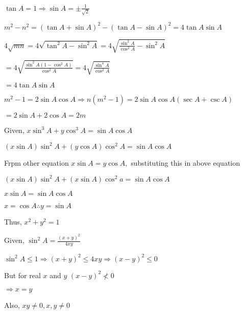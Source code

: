     $\tan A = 1\Rightarrow \sin A = \pm\frac{1}{\sqrt{2}}$

\item $m^2 - n^2 = (\tan A +\sin A)^2 - (\tan A - \sin A)^2 = 4\tan A\sin A$

    $4\sqrt{mn} = 4\sqrt{\tan^2A - \sin^2A} = 4\sqrt{\frac{\sin^2A}{\cos^2A} - \sin^2A}$

    $= 4\sqrt{\frac{\sin^2A(1 - \cos^2A)}{\cos^2A}} = 4\sqrt{\frac{\sin^4A}{\cos^2A}}$

    $= 4\tan A\sin A$

\item $m^2 - 1 = 2\sin A\cos A \Rightarrow n(m^2 - 1) = 2\sin A\cos A(\sec A + \csc A)$

    $= 2\sin A + 2\cos A = 2m$

\item Given, $x\sin^3 A + y\cos^3 A = \sin A\cos A$

    $(x\sin A)\sin^2A + (y\cos A)\cos^2A = \sin A\cos A$

    Frpm other equation $x\sin A = y\cos A,$ substituting this in above equation

    $(x\sin A)\sin^2A + (x\sin A)\cos^2a = \sin A\cos A$

    $x\sin A = \sin A\cos A$

    $x = \cos A \therefore y = \sin A$

    Thus, $x^2 + y^2 = 1$

\item Given, $\sin^2A = \frac{(x + y)^2}{4xy}$

    $\sin^2A \leq 1 \Rightarrow (x + y)^2 \leq 4xy \Rightarrow (x - y)^2 \leq 0$

    But for real $x$ and $y$ $(x - y)^2\nless 0$

    $\Rightarrow x = y$

    Also, $xy \neq 0, x, y\neq 0$
\stopitemize
